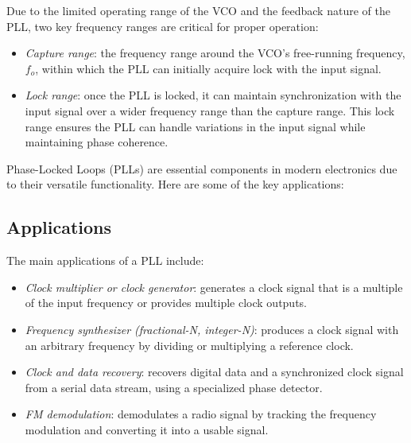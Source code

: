 Due to the limited operating range of the VCO and the feedback nature of the PLL, two key frequency ranges are critical for proper operation:
\begin{itemize}
    \item \textit{Capture range}: the frequency range around the VCO's free-running frequency, $f_{{o}}$, within which the PLL can initially acquire lock with the input signal.
    \item \textit{Lock range}: once the PLL is locked, it can maintain synchronization with the input signal over a wider frequency range than the capture range. 
        This lock range ensures the PLL can handle variations in the input signal while maintaining phase coherence.
\end{itemize}
Phase-Locked Loops (PLLs) are essential components in modern electronics due to their versatile functionality. 
Here are some of the key applications:

\subsection{Applications}
The main applications of a PLL include:
\begin{itemize}
    \item \textit{Clock multiplier or clock generator}: generates a clock signal that is a multiple of the input frequency or provides multiple clock outputs.
    \item \textit{Frequency synthesizer (fractional-N, integer-N)}: produces a clock signal with an arbitrary frequency by dividing or multiplying a reference clock.
    \item \textit{Clock and data recovery}: recovers digital data and a synchronized clock signal from a serial data stream, using a specialized phase detector.
    \item \textit{FM demodulation}: demodulates a radio signal by tracking the frequency modulation and converting it into a usable signal.
\end{itemize}

